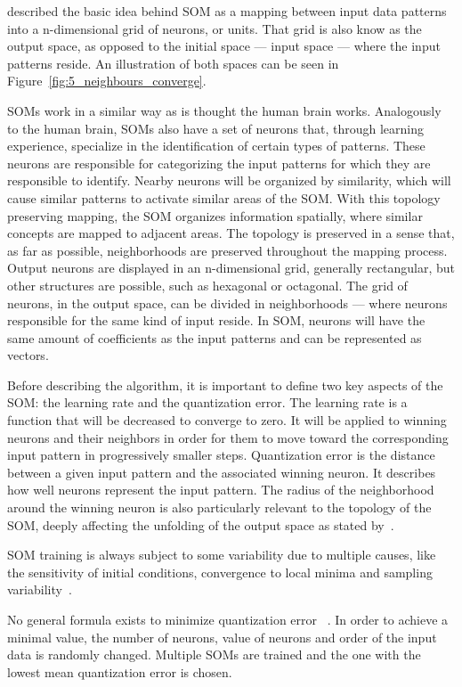\documentclass[journal]{IEEEtran}
\begin{document}
\citet{Bacao2005} described the basic idea behind \ac{SOM} as a mapping between input data patterns into a n-dimensional grid of neurons, or units. That grid is also know as the output space, as opposed to the initial space --- input space --- where the input patterns reside. An illustration of both spaces can be seen in Figure~\ref{fig:5_neighbours_converge}.

SOMs work in a similar way as is thought the human brain works. Analogously to the human brain, SOMs also have a set of neurons that, through learning experience, specialize in the identification of certain types of patterns. These neurons are responsible for categorizing the input patterns for which they are responsible to identify. Nearby neurons will be organized by similarity, which will cause similar patterns to activate similar areas of the \ac{SOM}.
With this topology preserving mapping, the \ac{SOM} organizes information spatially, where similar concepts are mapped to adjacent areas. The topology is preserved in a sense that, as far as possible, neighborhoods are preserved throughout the mapping process.
Output neurons are displayed in an n-dimensional grid, generally rectangular, but other structures are possible, such as hexagonal or octagonal.  The grid of neurons, in the output space, can be divided in neighborhoods --- where neurons responsible for the same kind of input reside.
In \ac{SOM}, neurons will have the same amount of coefficients as the input patterns and can be represented as vectors.

Before describing the algorithm, it is important to define two key aspects of the \ac{SOM}: the learning rate and the quantization error. The learning rate is a function that will be decreased to converge to zero. It will be applied to winning neurons and their neighbors in order for them to move toward the corresponding input pattern in progressively smaller steps. Quantization error is the distance between a given input pattern and the associated winning neuron. It describes how well neurons represent the input pattern. The radius of the neighborhood around the winning neuron is also particularly relevant to the topology of the \ac{SOM}, deeply affecting the unfolding of the output space as stated by~\citet{Bacao2005}. 

SOM training is always subject to some variability due to multiple causes, like the sensitivity of initial conditions, convergence to local minima and sampling variability~\cite{Bodt}.

No general formula exists to minimize quantization error~\cite{Bodt} . In order to achieve a minimal value, the number of neurons, value of neurons and order of the input data is randomly changed. Multiple SOMs are trained and the one with the lowest mean quantization error is chosen.
\end{document}
